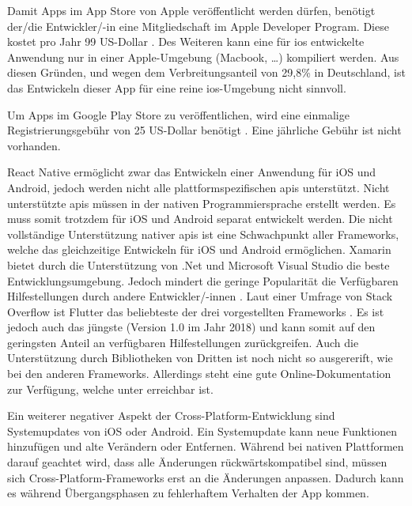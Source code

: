Damit Apps im App Store von Apple veröffentlicht werden dürfen, benötigt der/die Entwickler/-in eine Mitgliedschaft im Apple Developer Program. Diese kostet pro Jahr 99 US-Dollar \cite{misc:appledeveloper}.
Des Weiteren kann eine für i\gls{os} entwickelte Anwendung nur in einer Apple-Umgebung (Macbook, \dots) kompiliert werden. \newline
Aus diesen Gründen, und wegen dem Verbreitungsanteil von 29,8\% in Deutschland, ist das Entwickeln dieser App für eine reine i\gls{os}-Umgebung nicht sinnvoll. \newline

Um Apps im Google Play Store zu veröffentlichen, wird eine einmalige Registrierungsgebühr von 25 US-Dollar benötigt \cite{misc:androiddeveloper}. Eine jährliche Gebühr ist 
nicht vorhanden.

React Native ermöglicht zwar das Entwickeln einer Anwendung für iOS und Android, jedoch werden nicht alle plattformspezifischen \glspl{api} unterstützt. Nicht unterstützte 
\glspl{api} müssen in der nativen Programmiersprache erstellt werden. Es muss somit trotzdem für iOS und Android separat entwickelt werden. \cite{misc:reactnative_vs_native}\newline
Die nicht vollständige Unterstützung nativer \glspl{api} ist eine Schwachpunkt aller Frameworks, welche das gleichzeitige Entwickeln für iOS und Android ermöglichen. \newline
Xamarin bietet durch die Unterstützung von .Net und Microsoft Visual Studio die beste Entwicklungsumgebung. Jedoch mindert die geringe Popularität die Verfügbaren Hilfestellungen 
durch andere Entwickler/-innen \cite{misc:flutter_reactnative_xamarin}. \newline
Laut einer Umfrage von Stack Overflow ist Flutter das beliebteste der drei vorgestellten Frameworks \cite{misc:so_popularity}. Es ist jedoch auch das jüngste 
(Version 1.0 im Jahr 2018) und kann somit auf den geringsten Anteil an verfügbaren Hilfestellungen zurückgreifen. Auch die Unterstützung durch Bibliotheken von Dritten ist 
noch nicht so ausgererift, wie bei den anderen Frameworks. Allerdings steht eine gute Online-Dokumentation zur Verfügung, welche unter \cite{misc:flutter_docs} erreichbar ist.
\cite{misc:flutter_reactnative_xamarin}

Ein weiterer negativer Aspekt der Cross-Platform-Entwicklung sind Systemupdates von iOS oder Android. Ein Systemupdate kann neue Funktionen hinzufügen und alte Verändern 
oder Entfernen. Während bei nativen Plattformen darauf geachtet wird, dass alle Änderungen rückwärtskompatibel sind, müssen sich Cross-Platform-Frameworks erst an die 
Änderungen anpassen. Dadurch kann es während Übergangsphasen zu fehlerhaftem Verhalten der App kommen.

